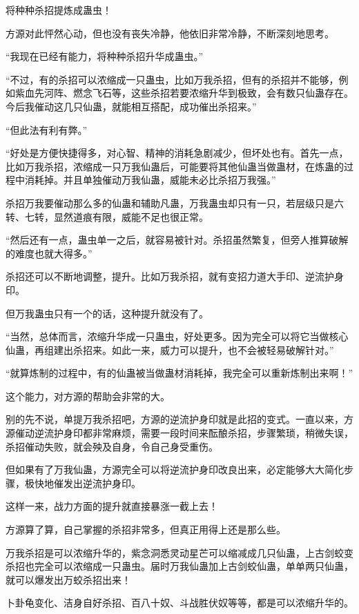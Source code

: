 \begin{this_body}
将种种杀招提炼成蛊虫！

方源对此怦然心动，但也没有丧失冷静，他依旧非常冷静，不断深刻地思考。

“我现在已经有能力，将种种杀招升华成蛊虫。”

“不过，有的杀招可以浓缩成一只蛊虫，比如万我杀招，但有的杀招并不能够，例如紫血先河阵、燃念飞石等，这些杀招若要浓缩升华到极致，会有数只仙蛊存在。今后我催动这几只仙蛊，就能相互搭配，成功催出杀招来。”

“但此法有利有弊。”

“好处是方便快捷得多，对心智、精神的消耗急剧减少，但坏处也有。首先一点，比如万我杀招，浓缩成一只万我仙蛊后，可能要将其他仙蛊当做蛊材，在炼蛊的过程中消耗掉。并且单独催动万我仙蛊，威能未必比杀招万我强。”

杀招万我要催动那么多的仙蛊和辅助凡蛊，万我蛊虫却只有一只，若层级只是六转、七转，显然道痕有限，威能不足也很正常。

“然后还有一点，蛊虫单一之后，就容易被针对。杀招虽然繁复，但旁人推算破解的难度也就大得多。”

杀招还可以不断地调整，提升。比如万我杀招，就有变招力道大手印、逆流护身印。

但万我蛊虫只有一个的话，这种提升就没有了。

“当然，总体而言，浓缩升华成一只蛊虫，好处更多。因为完全可以将它当做核心仙蛊，再组建出杀招来。如此一来，威力可以提升，也不会被轻易破解针对。”

“就算炼制的过程中，有的仙蛊被当做蛊材消耗掉，我完全可以重新炼制出来啊！”

这个能力，对方源的帮助会非常的大。

别的先不说，单提万我杀招吧，方源的逆流护身印就是此招的变式。一直以来，方源催动逆流护身印都非常麻烦，需要一段时间来酝酿杀招，步骤繁琐，稍微失误，杀招催动失败，就会殃及自身，令自己身受重伤。

但如果有了万我仙蛊，方源完全可以将逆流护身印改良出来，必定能够大大简化步骤，极快地催发出逆流护身印。

这样一来，战力方面的提升就直接暴涨一截上去！

方源算了算，自己掌握的杀招非常多，但真正用得上还是那么些。

万我杀招是可以浓缩升华的，紫念洞悉灵动星芒可以缩减成几只仙蛊，上古剑蛟变杀招也完全可以浓缩成一只蛊虫。届时万我仙蛊加上古剑蛟仙蛊，单单两只仙蛊，就可以爆发出万蛟杀招出来！

卜卦龟变化、洁身自好杀招、百八十奴、斗战胜伏奴等等，都是可以浓缩升华的。


\end{this_body}
